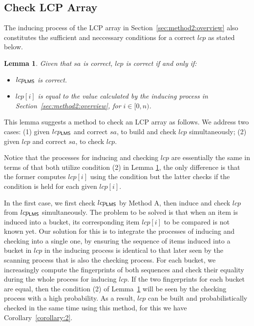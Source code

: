 \documentclass[10pt,journal,compsoc]{IEEEtran}
\newtheorem{Lemma}{Lemma}
\begin{document}
	\subsection{Check LCP Array} \label{sec:method2:check_lcp}
	
	The inducing process of the LCP array in Section~\ref{sec:method2:overview} also constitutes the sufficient and neccessary conditions for a correct $lcp$ as stated below.
	
	\begin{Lemma}
		\label{lcp:correct}
		Given that $sa$ is correct, $lcp$ is correct if and only if:
		\begin{itemize}
			\item[(1)]
			$lcp_{\sf LMS}$ is correct.
			
			\item[(2)]
			$lcp[i]$ is equal to the value calculated by the inducing process in Section~\ref{sec:method2:overview}, for $i \in [0, n)$.

		\end{itemize}
	\end{Lemma}
	
	
	This lemma suggests a method to check an LCP array as follows.
	We address two cases: (1) given $lcp_{\sf LMS}$ and correct $sa$, to build and check $lcp$ simultaneously; (2) given $lcp$ and correct $sa$, to check $lcp$.
	
	Notice that the processes for inducing and checking $lcp$ are essentially the same in terms of that both utilize condition (2) in Lemma \ref{lcp:correct}, the only difference is that the former computes $lcp[i]$ using the condition but the latter checks if the condition is held for each given $lcp[i]$.
	
	\vspace{1ex}  In the first case, we first check $lcp_{\sf LMS}$ by Method A, then induce and check $lcp$ from $lcp_{\sf LMS}$ simultaneously. The problem to be solved is that when an item is induced into a bucket, its corresponding item $lcp[i]$ to be compared is not known yet.
	Our solution for this is to integrate the processes of inducing and checking into a single one, by ensuring the sequence of items induced into a bucket in $lcp$ in the inducing process is identical to that later seen by the scanning process that is also the checking process.
	For each bucket, we increasingly compute the fingerprints of both sequences and check their equality during the whole process for inducing $lcp$.
	If the two fingerprints for each bucket are equal, then the condition (2) of Lemma~\ref{lcp:correct} will be seen by the checking process with a high probability.
	As a result, $lcp$ can be built and probabilistically checked in the same time using this method, for this we have Corollary~\ref{corollary:2}.
	
\end{document}
